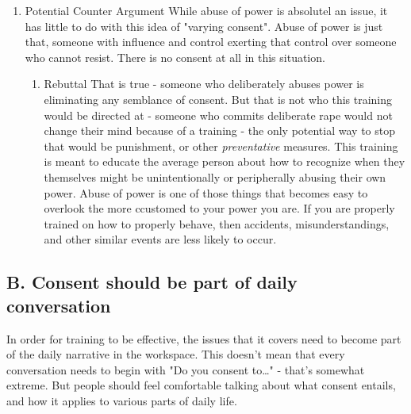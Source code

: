 \documentclass[11pt]{article}
\begin{document}
\begin{enumerate}
\item Potential Counter Argument
\label{sec:org4d188f6}
While abuse of power is absolutel an issue, it has little to do with this idea of "varying consent". Abuse of power is just that, someone with influence and control exerting that control over someone who cannot resist. There is no consent at all in this situation.

\begin{enumerate}
\item Rebuttal
\label{sec:org7f8ee3c}
That is true - someone who deliberately abuses power is eliminating any semblance of consent. But that is not who this training would be directed at - someone who commits deliberate rape would not change their mind because of a training -  the only potential way to stop that would be punishment, or other \emph{preventative} measures. This training is meant to educate the average person about how to recognize when they themselves might be unintentionally or peripherally abusing their own power. Abuse of power is one of those things that becomes easy to overlook the more ccustomed to your power you are. If you are properly trained on how to properly behave, then accidents, misunderstandings, and other similar events are less likely to occur.
\end{enumerate}
\end{enumerate}

\subsection{B. Consent should be part of daily conversation}
\label{sec:org61a45f3}
In order for training to be effective, the issues that it covers need to become part of the daily narrative in the workspace. This doesn't mean that every conversation needs to begin with "Do you consent to\ldots{}" - that's somewhat extreme. But people should feel comfortable talking about what consent entails, and how it applies to various parts of daily life. 
\end{document}
